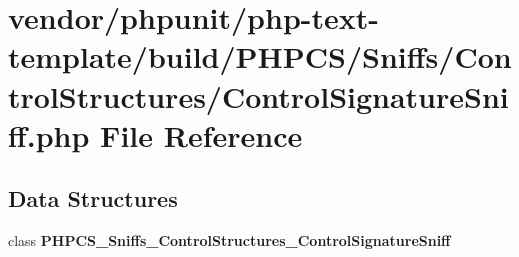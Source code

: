 \section{vendor/phpunit/php-\/text-\/template/build/\+P\+H\+P\+C\+S/\+Sniffs/\+Control\+Structures/\+Control\+Signature\+Sniff.php File Reference}
\label{php-text-template_2build_2_p_h_p_c_s_2_sniffs_2_control_structures_2_control_signature_sniff_8php}
\subsection*{Data Structures}
\begin{DoxyCompactItemize}
\item 
class {\bf P\+H\+P\+C\+S\+\_\+\+Sniffs\+\_\+\+Control\+Structures\+\_\+\+Control\+Signature\+Sniff}
\end{DoxyCompactItemize}
